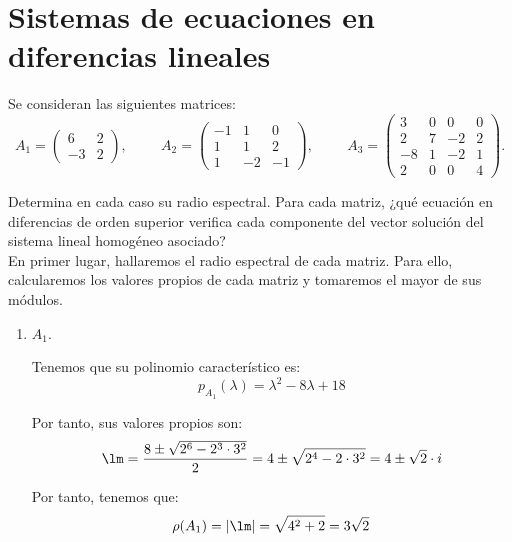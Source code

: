\section{Sistemas de ecuaciones en diferencias lineales}

\begin{ejercicio}
Se consideran las siguientes matrices:
\begin{equation*}
    A_1 =
    \begin{pmatrix}
    6 & 2\\
    -3 & 2
    \end{pmatrix}
    , \hspace{1cm}
    A_2=
    \begin{pmatrix}
    -1 & 1 & 0\\
    1 & 1 & 2\\
    1 & -2 & -1
    \end{pmatrix}
    , \hspace{1cm}
    A_3=\begin{pmatrix}
    3 & 0 & 0 & 0\\
    2 & 7 & -2 & 2\\
    -8 & 1 & -2 & 1\\
    2 & 0 & 0 & 4
    \end{pmatrix}.
\end{equation*}

Determina en cada caso su radio espectral. Para cada matriz, ¿qué ecuación en diferencias de orden superior verifica cada componente del vector solución del sistema lineal homogéneo asociado?\\

En primer lugar, hallaremos el radio espectral de cada matriz. Para ello, calcularemos los valores propios de cada matriz y tomaremos el mayor de sus módulos.
\begin{enumerate}
    \item $A_1$.
    
    Tenemos que su polinomio característico es:
    \begin{equation*}
        p_{A_1}(\lambda) = \lambda^2 - 8\lambda + 18
    \end{equation*}

    Por tanto, sus valores propios son:
    \begin{equation*}
        \lm = \frac{8\pm \sqrt{2^6-2^3\cdot 3^2}}{2}
        = 4\pm \sqrt{2^4-2\cdot 3^2}
        = 4\pm \sqrt{2}\cdot i
    \end{equation*}

    Por tanto, tenemos que:
    \begin{equation*}
        \rho(A_1) = |\lm| = \sqrt{4^2 + 2} = 3\sqrt{2}
    \end{equation*}



\end{enumerate}
\end{ejercicio}
